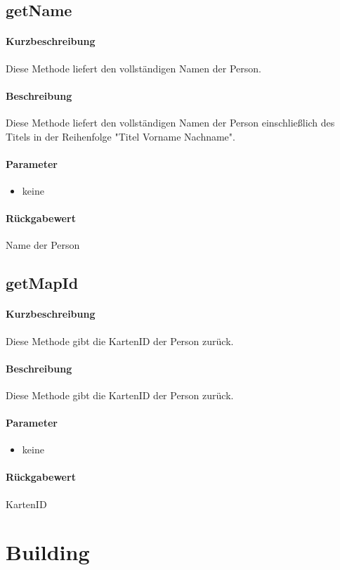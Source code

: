 \subsection{getName}%
\paragraph*{Kurzbeschreibung}
Diese Methode liefert den vollständigen Namen der Person.
\paragraph*{Beschreibung}
Diese Methode liefert den vollständigen Namen der Person einschließlich des Titels in der Reihenfolge "Titel Vorname Nachname".
\paragraph*{Parameter}
\begin{itemize}
    \item keine
\end{itemize}
\paragraph*{Rückgabewert}
Name der Person

\subsection{getMapId}
\paragraph*{Kurzbeschreibung}
Diese Methode gibt die KartenID der Person zurück.
\paragraph*{Beschreibung}
Diese Methode gibt die KartenID der Person zurück.
\paragraph*{Parameter}
\begin{itemize}
    \item keine
\end{itemize}
\paragraph*{Rückgabewert}
KartenID

\section{Building}
